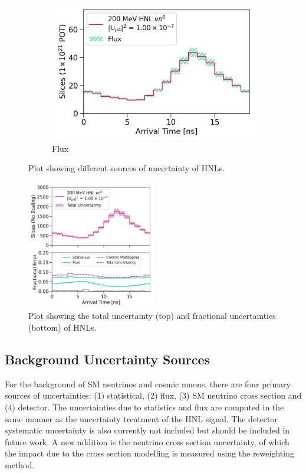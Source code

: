 \begin{figure}[htbp!]
\begin{subfigure}[b]{0.495\textwidth}
            \includegraphics[width=\textwidth]{hnl_flux_error}
            \caption{Flux}%
            \label{fig:hnl_flux}
        \end{subfigure}
        \caption{
	Plot showing different sources of uncertainty of HNLs.
	}
        \label{fig:hnl_error}
	\vspace{0.5cm}
\centering    
\includegraphics[width=0.5\textwidth]{hnl_error}
\caption[hnl_error]{
Plot showing the total uncertainty (top) and fractional uncertainties (bottom) of HNLs.
}
\label{fig:hnl_total_error}
\end{figure}

\subsection{Background Uncertainty Sources}

For the background of SM neutrinos and cosmic muons, there are four primary sources of uncertainties: (1) statistical, (2) flux, (3) SM neutrino cross section and (4) detector.
The uncertainties due to statistics and flux are computed in the same manner as the uncertainty treatment of the HNL signal.
The detector systematic uncertainty is also currently not included but should be included in future work.
A new addition is the neutrino cross section uncertainty, of which the impact due to the cross section modelling 
is measured using the reweighting method.

